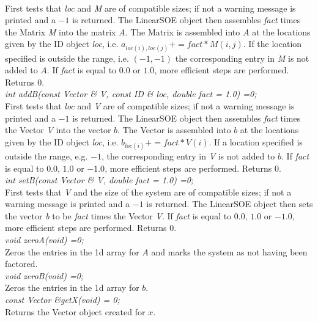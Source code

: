  \\
First tests that {\em loc} and {\em M} are of compatible sizes; if not
a warning message is printed and a $-1$ is returned. The LinearSOE
object then assembles {\em fact} times the Matrix {\em 
M} into the matrix $A$. The Matrix is assembled into $A$ at the
locations given by the ID object {\em loc}, i.e. $a_{loc(i),loc(j)} +=
fact * M(i,j)$. If the location specified is outside the range,
i.e. $(-1,-1)$ the corresponding entry in {\em M} is not added to
$A$. If {\em fact} is equal to $0.0$ or $1.0$, more efficient steps
are performed. Returns $0$.  \\


{\em int addB(const Vector \& V, const ID \& loc,
double fact = 1.0) =0;} \\
First tests that {\em loc} and {\em V} are of compatible sizes; if not
a warning message is printed and a $-1$ is returned. The LinearSOE
object then assembles {\em fact} times the Vector {\em V} into
the vector $b$. The Vector is assembled into $b$ at the locations
given by the ID object {\em loc}, i.e. $b_{loc(i)} += fact * V(i)$. If a
location specified is outside the range, e.g. $-1$, the corresponding
entry in {\em V} is not added to $b$. If {\em fact} is equal to $0.0$,
$1.0$ or $-1.0$, more efficient steps are performed. Returns $0$. \\


{\em int setB(const Vector \& V, double fact = 1.0) =0;} \\
First tests that {\em V} and the size of the system are of compatible
sizes; if not a warning message is printed and a $-1$ is returned. The
LinearSOE object then sets the vector {\em b} to be {\em fact} times
the Vector {\em V}. If {\em fact} is equal to $0.0$, $1.0$ or $-1.0$,
more efficient steps are performed. Returns $0$. \\ 

{\em void zeroA(void) =0;} \\
Zeros the entries in the 1d array for $A$ and marks the system as not
having been factored. \\

{\em void zeroB(void) =0;} \\
Zeros the entries in the 1d array for $b$. \\

{\em const Vector \&getX(void) = 0;} \\
Returns the Vector object created for $x$. \\

